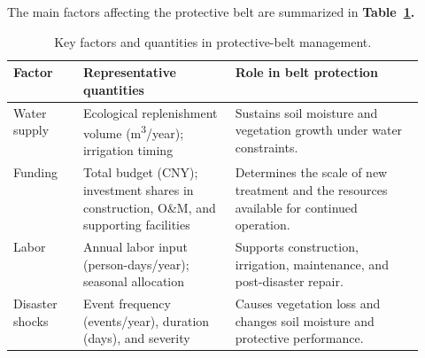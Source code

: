 \documentclass{mcmthesis}
\begin{document}
The main factors affecting the protective belt are summarized in
\textbf{Table~\ref{tab:protection-factors}.}
\begin{table}[htbp]
  \centering
  \caption{Key factors and quantities in protective-belt management.}
  \label{tab:protection-factors}
  \begingroup\small
  \renewcommand{\arraystretch}{1.18}
  \begin{tabularx}{\linewidth}{@{}>{\raggedright\arraybackslash}p{0.17\linewidth}
    >{\raggedright\arraybackslash}p{0.37\linewidth}
    >{\raggedright\arraybackslash}X@{}}
    \toprule
    \textbf{Factor} & \textbf{Representative quantities} & \textbf{Role in belt protection} \\
    \midrule
    Water supply & Ecological replenishment volume (m\textsuperscript{3}/year); irrigation timing
      & Sustains soil moisture and vegetation growth under water constraints. \\
    Funding & Total budget (CNY); investment shares in construction, O\&M, and supporting facilities
      & Determines the scale of new treatment and the resources available for continued operation. \\
    Labor & Annual labor input (person-days/year); seasonal allocation
      & Supports construction, irrigation, maintenance, and post-disaster repair. \\
    Disaster shocks & Event frequency (events/year), duration (days), and severity
      & Causes vegetation loss and changes soil moisture and protective performance. \\
    \bottomrule
  \end{tabularx}
  \endgroup
\end{table}
\end{document}
